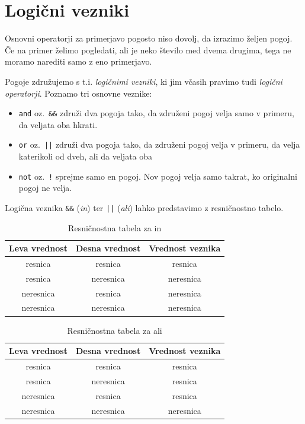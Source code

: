 \documentclass{book}
\begin{document}
\section{Logični vezniki}

Osnovni operatorji za primerjavo pogosto niso dovolj, da izrazimo željen pogoj.
Če na primer želimo pogledati, ali je neko število med dvema drugima, tega ne
moramo narediti samo z eno primerjavo.

Pogoje združujemo s t.i. \emph{logičnimi vezniki}, ki jim včasih pravimo tudi
\emph{logični operatorji}. Poznamo tri osnovne veznike:
\begin{itemize}
  \item \verb+and+ oz.~\verb+&&+ združi dva pogoja tako, da združeni pogoj velja
	samo v primeru, da veljata oba hkrati.
  \item \verb+or+ oz.~\verb+||+ združi dva pogoja tako, da združeni pogoj velja
	v primeru, da velja katerikoli od dveh, ali da veljata oba
  \item \verb+not+ oz.~\verb+!+ sprejme samo en pogoj. Nov pogoj velja samo
	takrat, ko originalni pogoj ne velja.
\end{itemize}

Logična veznika \verb+&&+ (\emph{in}) ter \verb+||+ (\emph{ali}) lahko
predstavimo z resničnostno tabelo.

\begin{table}[h!]
  \centering
  \caption{Resničnostna tabela za in}
  \vspace{0.1cm}
  \begin{tabular}{c|c|c}
	Leva vrednost & Desna vrednost & Vrednost veznika \\
	\hline
	resnica & resnica & resnica \\
	resnica & neresnica & neresnica \\
	neresnica & resnica & neresnica \\
	neresnica & neresnica & neresnica
  \end{tabular}
\end{table}

\begin{table}[h!]
  \centering
  \caption{Resničnostna tabela za ali}
  \vspace{0.1cm}
  \begin{tabular}{c|c|c}
	Leva vrednost & Desna vrednost & Vrednost veznika \\
	\hline
	resnica & resnica & resnica \\
	resnica & neresnica & resnica \\
	neresnica & resnica & resnica \\
	neresnica & neresnica & neresnica
  \end{tabular}
\end{table}
\end{document}

